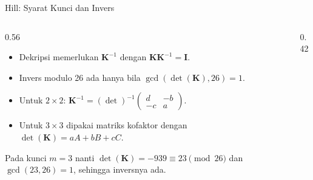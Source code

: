 \documentclass[aspectratio=169,11pt]{beamer}
\begin{document}
\begin{frame}{Hill: Syarat Kunci dan Invers}
    \begin{columns}[T,onlytextwidth]
        \begin{column}{0.56\textwidth}
            \footnotesize
            \begin{itemize}
                \item Dekripsi memerlukan $\mathbf{K}^{-1}$ dengan
                      $\mathbf{KK}^{-1}=\mathbf{I}$.
                \item Invers modulo 26 ada hanya bila
                      $\gcd(\det(\mathbf{K}),26)=1$.
                \item Untuk $2\times2$:
                      $\mathbf{K}^{-1}=(\det)^{-1}
                      \begin{pmatrix}d&-b\\-c&a\end{pmatrix}$.
                \item Untuk $3\times3$ dipakai matriks kofaktor dengan
                      $\det(\mathbf{K})=aA+bB+cC$.
            \end{itemize}
            \begin{alertblock}{Pada kunci $m=3$ nanti}
                \footnotesize
                $\det(\mathbf{K})=-939\equiv 23\pmod{26}$ dan
                $\gcd(23,26)=1$, sehingga inversnya ada.
            \end{alertblock}
        \end{column}
        \begin{column}{0.42\textwidth}
            \centering
        \end{column}
    \end{columns}
\end{frame}
\end{document}

